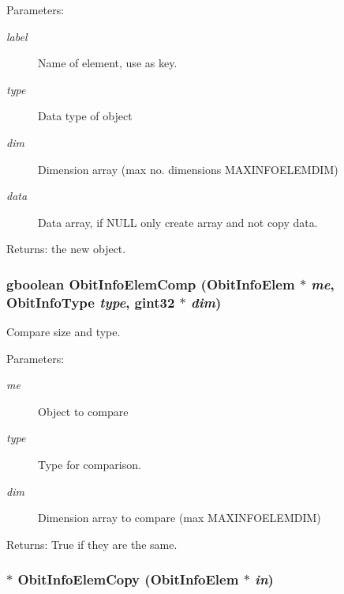 \begin{Desc}
\item[Parameters:]
\begin{description}
\item[{\em label}]Name of element, use as key. \item[{\em type}]Data type of object \item[{\em dim}]Dimension array (max no. dimensions MAXINFOELEMDIM) \item[{\em data}]Data array, if NULL only create array and not copy data. \end{description}
\end{Desc}
\begin{Desc}
\item[Returns:]the new object. \end{Desc}
\subsubsection{\setlength{\rightskip}{0pt plus 5cm}gboolean Obit\-Info\-Elem\-Comp ({\bf Obit\-Info\-Elem} $\ast$ {\em me}, Obit\-Info\-Type {\em type}, gint32 $\ast$ {\em dim})}\label{ObitInfoElem_8h_a6}


Compare size and type. 

\begin{Desc}
\item[Parameters:]
\begin{description}
\item[{\em me}]Object to compare \item[{\em type}]Type for comparison. \item[{\em dim}]Dimension array to compare (max MAXINFOELEMDIM) \end{description}
\end{Desc}
\begin{Desc}
\item[Returns:]True if they are the same. \end{Desc}
\subsubsection{$\ast$ Obit\-Info\-Elem\-Copy ({\bf Obit\-Info\-Elem} $\ast$ {\em in})}\label{ObitInfoElem_8h_a3}


